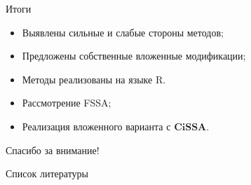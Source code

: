 \documentclass[notheorems, handout]{beamer}
\newcommand{\CISSA}{\textbf{CiSSA}}
\begin{document}
\begin{frame}{Итоги}
	\textbf{}
	\begin{itemize}
		\item Выявлены сильные и слабые стороны методов;
		\item Предложены собственные вложенные модификации;
		\item Методы реализованы на языке R.
	\end{itemize}

	\textbf{}
	\begin{itemize}
		\item Рассмотрение FSSA;
		\item Реализация вложенного варианта с $\CISSA$.
	\end{itemize}
\end{frame}

\begin{frame}
	\begin{center}
		\Huge
		Спасибо за внимание!
	\end{center}

\end{frame}

\begin{frame}[allowframebreaks]{Список литературы}
	\printbibliography
\end{frame}
\end{document}
